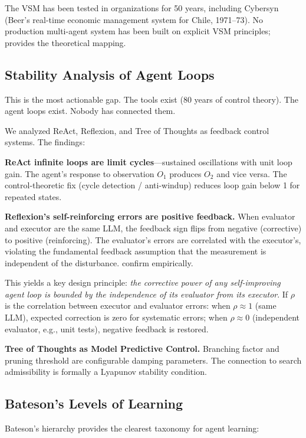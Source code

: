 \documentclass[11pt]{article}
\begin{document}
The VSM has been tested in organizations for 50 years, including Cybersyn (Beer's real-time economic management system for Chile, 1971--73). No production multi-agent system has been built on explicit VSM principles; \citet{gorelkin2025vsm} provides the theoretical mapping.

\subsection{Stability Analysis of Agent Loops}

This is the most actionable gap. The tools exist (80 years of control theory). The agent loops exist. Nobody has connected them.

We analyzed ReAct, Reflexion, and Tree of Thoughts as feedback control systems. The findings:

\textbf{ReAct infinite loops are limit cycles}---sustained oscillations with unit loop gain. The agent's response to observation $O_1$ produces $O_2$ and vice versa. The control-theoretic fix (cycle detection / anti-windup) reduces loop gain below 1 for repeated states.

\textbf{Reflexion's self-reinforcing errors are positive feedback.} When evaluator and executor are the same LLM, the feedback sign flips from negative (corrective) to positive (reinforcing). The evaluator's errors are correlated with the executor's, violating the fundamental feedback assumption that the measurement is independent of the disturbance. \citet{huang2023selfcorrect} confirm empirically.

This yields a key design principle: \emph{the corrective power of any self-improving agent loop is bounded by the independence of its evaluator from its executor}. If $\rho$ is the correlation between executor and evaluator errors: when $\rho \approx 1$ (same LLM), expected correction is zero for systematic errors; when $\rho \approx 0$ (independent evaluator, e.g., unit tests), negative feedback is restored.

\textbf{Tree of Thoughts as Model Predictive Control.} Branching factor and pruning threshold are configurable damping parameters. The connection to search admissibility is formally a Lyapunov stability condition.

\subsection{Bateson's Levels of Learning}

Bateson's hierarchy \cite{bateson1972steps} provides the clearest taxonomy for agent learning:
\end{document}

